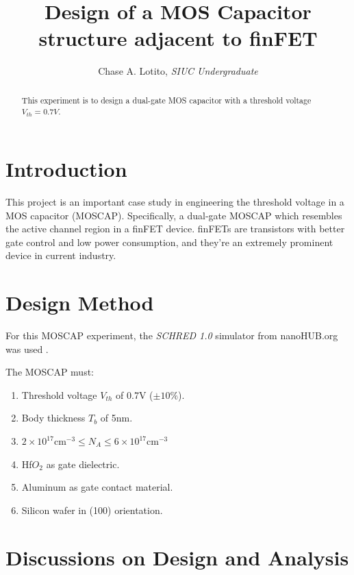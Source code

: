 \documentclass{IEEEtran}
\title{Design of a MOS Capacitor structure adjacent to finFET}
\author{Chase A. Lotito, \textit{SIUC Undergraduate}}
\date{}
\begin{document}
\maketitle %

\begin{abstract}
    This experiment is to design a dual-gate MOS capacitor with a threshold voltage \(V_{th} = 0.7V\).     
\end{abstract}

\section{Introduction}

This project is an important case study in engineering the threshold voltage in a MOS capacitor (MOSCAP). Specifically, a dual-gate MOSCAP which resembles the active channel region in a finFET device. finFETs are transistors with better gate control and low power consumption, and they're an extremely prominent device in current industry.   

\section{Design Method}

For this MOSCAP experiment, the \textit{SCHRED 1.0} simulator from nanoHUB.org was used \cite{sim}.

The MOSCAP must:
\begin{enumerate}
    \item Threshold voltage \(V_{th}\) of 0.7V (\(\pm 10\%\)). \\
    \item Body thickness \(T_b\) of 5nm. \\
    \item \(2 \times 10^{17} \text{cm}^{-3} \leq N_A \leq  6 \times 10^{17} \text{cm}^{-3}\) \\
    \item Hf\(O_2\) as gate dielectric. \\
    \item Aluminum as gate contact material. \\
    \item Silicon wafer in (100) orientation.
\end{enumerate}


\section{Discussions on Design and Analysis}
\end{document}
